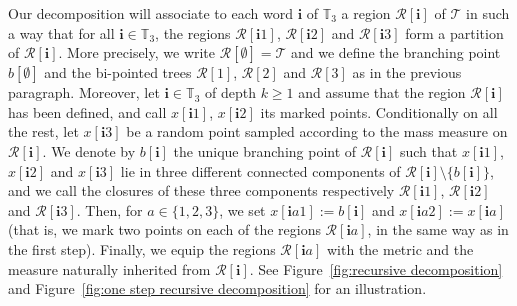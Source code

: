 \documentclass[11pt]{article}
\let\backslash\setminus
\newcommand{\Tt}{\mathcal{T}}
\newcommand{\Rr}{\mathcal{R}}
\newcommand{\ii}{\mathbf{i}}
\theoremstyle{plain}
\theoremstyle{definition}
\numberwithin{equation}{section}
\begin{document}
Our decomposition will associate to each word $\ii $ of $\mathbb{T}_3$ a region $\Rr[\ii ]$ of $\Tt$ in such a way that for all $\ii \in \mathbb{T}_3$, the regions $\Rr[\ii 1]$, $\Rr[\ii 2]$ and $\Rr[\ii 3]$ form a partition of $\Rr[\ii ]$.
More precisely, we write $\Rr[\emptyset]=\Tt$ and we define the branching point $b[\emptyset]$ and the bi-pointed trees $\Rr[1]$, $\Rr[2]$ and $\Rr[3]$ as in the previous paragraph.
Moreover, let $\ii \in \mathbb{T}_3$ of depth $k \geq 1$ and assume that the region $\Rr[\ii ]$ has been defined, and call $x[\ii 1]$, $x[\ii 2]$ its marked points.
Conditionally on all the rest, let $x[\ii 3]$ be a random point sampled according to the mass measure on $\Rr[\ii ]$.
We denote by $b[\ii]$ the unique branching point of $\Rr[\ii ]$ such that $x[\ii 1]$, $x[\ii 2]$ and $x[\ii 3]$ lie in three different connected components of $\Rr[\ii ] \backslash \{b[\ii]\}$, and we call the closures of these three components respectively $\Rr[\ii 1]$, $\Rr[\ii 2]$ and $\Rr[\ii 3]$.
Then, for $a \in \{1,2,3\}$, we set $x[\ii a1]:=b[\ii]$ and $x[\ii a 2]:=x[\ii a]$ (that is, we mark two points on each of the regions $\Rr[\ii a]$, in the same way as in the first step).
Finally, we equip the regions $\Rr[\ii a]$ with the metric and the measure naturally inherited from $\Rr[\ii ]$.
See Figure~\ref{fig:recursive decomposition} and Figure~\ref{fig:one step recursive decomposition} for an illustration.
\end{document}
